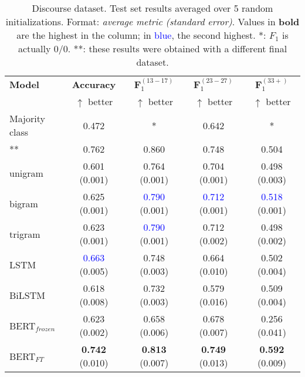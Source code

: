 \begin{table*}[h]
    \centering
    \begin{tabular}{l c c c c}
    \toprule
    \textbf{Model} & \textbf{Accuracy} & $\boldsymbol{F}_1^{(13-17)}$ & $\boldsymbol{F}_1^{(23-27)}$ & $\boldsymbol{F}_1^{(33+)}$\\
     & $\uparrow$ better & $\uparrow$ better & $\uparrow$ better & $\uparrow$ better\\
    \midrule
    Majority class
    & 0.472
    & * & 0.642
    & *\\
    \citet{schler2006effects}** & 0.762 & 0.860 & 0.748 & 0.504 \\
    \midrule
    unigram & 0.601 (0.001) & 0.764 (0.001) & 0.704 (0.001) & 0.498 (0.003)\\
    bigram & 0.625 (0.001) & \textcolor{blue}{0.790} (0.001) & \textcolor{blue}{0.712} (0.001) & \textcolor{blue}{0.518} (0.001)\\
    trigram & 0.623 (0.001) & \textcolor{blue}{0.790} (0.001) & 0.712 (0.002) & 0.498 (0.002)\\
    \midrule
    LSTM & \textcolor{blue}{0.663} (0.005) & 0.748 (0.003) & 0.664 (0.010) & 0.502 (0.004) \\
    BiLSTM & 0.618 (0.008) & 0.732 (0.003) & 0.579 (0.016) & 0.509 (0.004)\\
    \midrule
    BERT$_{frozen}$
    & 0.623 (0.002) & 0.658 (0.006) & 0.678 (0.007) & 0.256 (0.041)\\
    BERT$_{FT}$
    & \textbf{0.742} (0.010) & \textbf{0.813} (0.007) & \textbf{0.749} (0.013) & \textbf{0.592} (0.009)\\
    \bottomrule
    \end{tabular}
    \caption{Discourse dataset. Test set results averaged over 5 random initializations. Format: \textit{average metric (standard error)}. Values in \textbf{bold} are the highest in the column; in \textcolor{blue}{blue}, the second highest. *: $F_1$ is actually $0/0$. **: these results were obtained with a different final dataset.}
    \label{tab:blog_classification}
\end{table*}

